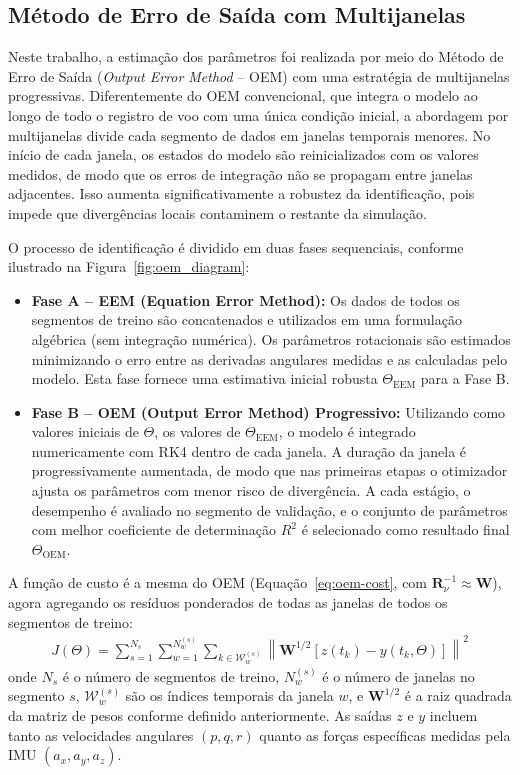 \documentclass{ieeeaccess}
\begin{document}
\subsection{Método de Erro de Saída com Multijanelas}

Neste trabalho, a estimação dos parâmetros foi realizada por meio do Método de Erro de Saída (\textit{Output Error Method} -- OEM) com uma estratégia de multijanelas progressivas. Diferentemente do OEM convencional, que integra o modelo ao longo de todo o registro de voo com uma única condição inicial, a abordagem por multijanelas divide cada segmento de dados em janelas temporais menores. No início de cada janela, os estados do modelo são reinicializados com os valores medidos, de modo que os erros de integração não se propagam entre janelas adjacentes. Isso aumenta significativamente a robustez da identificação, pois impede que divergências locais contaminem o restante da simulação.

O processo de identificação é dividido em duas fases sequenciais, conforme ilustrado na Figura~\ref{fig:oem_diagram}:

\begin{itemize}
    \item \textbf{Fase A -- EEM (Equation Error Method):} Os dados de todos os segmentos de treino são concatenados e utilizados em uma formulação algébrica (sem integração numérica). Os parâmetros rotacionais são estimados minimizando o erro entre as derivadas angulares medidas e as calculadas pelo modelo. Esta fase fornece uma estimativa inicial robusta $\Theta_{\text{EEM}}$ para a Fase B.
    \item \textbf{Fase B -- OEM (Output Error Method) Progressivo:} Utilizando como valores iniciais de $\Theta$, os valores de $\Theta_{\text{EEM}}$, o modelo é integrado numericamente com RK4 dentro de cada janela. A duração da janela é progressivamente aumentada, de modo que nas primeiras etapas o otimizador ajusta os parâmetros com menor risco de divergência. A cada estágio, o desempenho é avaliado no segmento de validação, e o conjunto de parâmetros com melhor coeficiente de determinação $R^2$ é selecionado como resultado final $\Theta_{\text{OEM}}$.
\end{itemize}

A função de custo é a mesma do OEM (Equação~\eqref{eq:oem-cost}, com $\mathbf{R}_\nu^{-1} \approx \mathbf{W}$), agora agregando os resíduos ponderados de todas as janelas de todos os segmentos de treino:
\begin{align}
J(\Theta) = \sum_{s=1}^{N_s} \sum_{w=1}^{N_w^{(s)}} \sum_{k \in \mathcal{W}_w^{(s)}} \left\| \mathbf{W}^{1/2} \left[ z(t_k) - y(t_k, \Theta) \right] \right\|^2
\end{align}
onde $N_s$ é o número de segmentos de treino, $N_w^{(s)}$ é o número de janelas no segmento $s$, $\mathcal{W}_w^{(s)}$ são os índices temporais da janela $w$, e $\mathbf{W}^{1/2}$ é a raiz quadrada da matriz de pesos conforme definido anteriormente. As saídas $z$ e $y$ incluem tanto as velocidades angulares $(p, q, r)$ quanto as forças específicas medidas pela IMU $(a_x, a_y, a_z)$.
\end{document}
